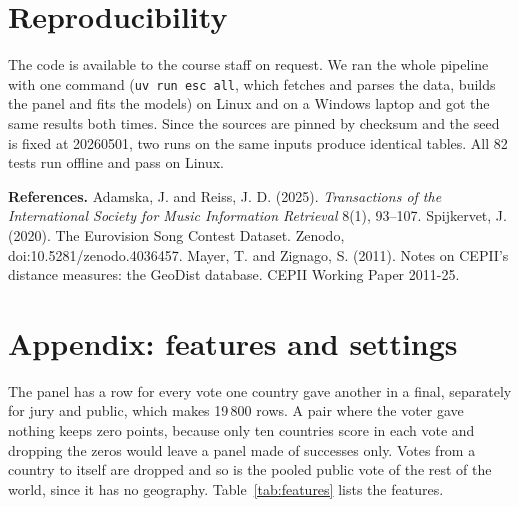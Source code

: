 \documentclass[a4paper,10pt]{article}
\begin{document}
\section{Reproducibility}

The code is available to the course staff on request.
We ran the whole pipeline with one command (\texttt{uv run esc all}, which fetches and parses the data, builds the panel and fits the models) on Linux and on a Windows laptop and got the same results both times.
Since the sources are pinned by checksum and the seed is fixed at 20260501, two runs on the same inputs produce identical tables.
All 82 tests run offline and pass on Linux.

\medskip
\footnotesize
\textbf{References.}
Adamska, J. and Reiss, J. D. (2025). \emph{Transactions of the International Society for Music Information Retrieval} 8(1), 93--107.
Spijkervet, J. (2020). The Eurovision Song Contest Dataset. Zenodo, doi:10.5281/zenodo.4036457.
Mayer, T. and Zignago, S. (2011). Notes on CEPII's distance measures: the GeoDist database. CEPII Working Paper 2011-25.

\section*{Appendix: features and settings}

\small
The panel has a row for every vote one country gave another in a final, separately for jury and public, which makes 19\,800 rows.
A pair where the voter gave nothing keeps zero points, because only ten countries score in each vote and dropping the zeros would leave a panel made of successes only.
Votes from a country to itself are dropped and so is the pooled public vote of the rest of the world, since it has no geography.
Table~\ref{tab:features} lists the features.
\end{document}
